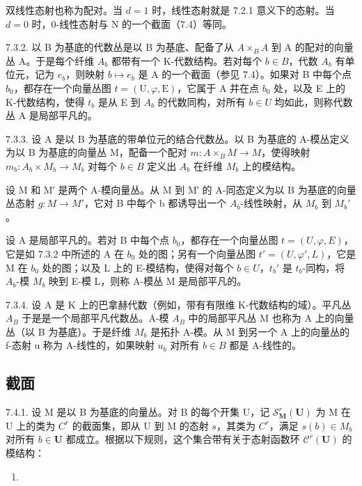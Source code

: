 双线性态射也称为配对。当 \(d=1\) 时，线性态射就是 7.2.1 意义下的态射。当 \(d=0\) 时，0-线性态射与 N 的一个截面（7.4）等同。

7.3.2. 以 B 为基底的代数丛是以 B 为基底、配备了从 \(A \times_{B} A\) 到 A 的配对的向量丛 A。于是每个纤维 \(A_{b}\) 都带有一个 K-代数结构。若对每个 \(b \in B\)，代数 \(A_{b}\) 有单位元，记为 \(e_{b}\)，则映射 \(b \mapsto e_{b}\) 是 A 的一个截面（参见 7.4）。如果对 B 中每个点 \(b_{0}\)，都存在一个向量丛图 \(t = (\mathrm{U}, \varphi, \mathrm{E})\)，它属于 A 并在点 \(b_{0}\) 处，以及 E 上的 K-代数结构，使得 \(t_{b}\) 是从 E 到 \(A_{b}\) 的代数同构，对所有 \(b \in U\) 均如此，则称代数丛 A 是局部平凡的。

7.3.3. 设 A 是以 B 为基底的带单位元的结合代数丛。以 B 为基底的 A-模丛定义为以 B 为基底的向量丛 M，配备一个配对 \(m: A \times_{B} M \to M\)，使得映射 \(m_{b}: A_{b} \times M_{b} \to M_{b}\) 对每个 \(b \in B\) 定义出 \(A_{b}\) 在纤维 \(M_{b}\) 上的模结构。

设 M 和 M′ 是两个 A-模向量丛。从 M 到 M′ 的 A-同态定义为以 B 为基底的向量丛态射 \(g: M \rightarrow M'\)，它对 B 中每个 b 都诱导出一个 \(A_b\)-线性映射，从 \(M_b\) 到 \(M_b'\)。

设 A 是局部平凡的。若对 B 中每个点 \(b_0\)，都存在一个向量丛图 \(t = (U, \varphi, E)\)，它是如 7.3.2 中所述的 A 在 \(b_0\) 处的图；另有一个向量丛图 \(t' = (U, \varphi', L)\)，它是 M 在 \(b_0\) 处的图；以及 L 上的 E-模结构，使得对每个 \(b \in U\)，\(t_b'\) 是 \(t_b\)-同构，将 \(A_b\)-模 \(M_b\) 映到 E-模 L，则称 A-模丛 M 是局部平凡的。

7.3.4. 设 A 是 K 上的巴拿赫代数（例如，带有有限维 K-代数结构的域）。平凡丛 \(A_{B}\) 于是是一个局部平凡代数丛。A-模 \(A_{B}\) 中的局部平凡丛 M 也称为 A 上的向量丛（以 B 为基底）。于是纤维 \(M_{b}\) 是拓扑 A-模。从 M 到另一个 A 上的向量丛的 f-态射 u 称为 A-线性的，如果映射 \(u_{b}\) 对所有 \(b \in B\) 都是 A-线性的。

\subsection{截面}

7.4.1. 设 M 是以 B 为基底的向量丛。对 B 的每个开集 U，记 \(\mathcal{S}_{\mathbf{M}}^{r}(\mathbf{U})\) 为 M 在 U 上的类为 \(C^r\) 的截面集，即从 U 到 M 的态射 \(s\)，其类为 \(C^r\)，满足 \(s(b) \in M_b\) 对所有 \(b \in \mathbf{U}\) 都成立。根据以下规则，这个集合带有关于态射函数环 \(\mathcal{C}^r(\mathbf{U})\) 的模结构：

\begin{enumerate}
\def\labelenumi{(\arabic{enumi})}
\tightlist
\item
\end{enumerate}


